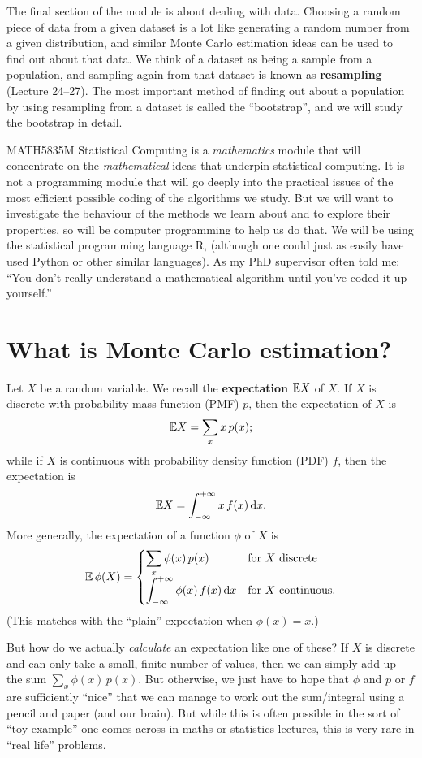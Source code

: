 \documentclass[
  letterpaper,
  DIV=11,
  numbers=noendperiod]{scrreprt}
\theoremstyle{plain}
\theoremstyle{definition}
\theoremstyle{definition}
\theoremstyle{remark}
\begin{document}
The final section of the module is about dealing with data. Choosing a
random piece of data from a given dataset is a lot like generating a
random number from a given distribution, and similar Monte Carlo
estimation ideas can be used to find out about that data. We think of a
dataset as being a sample from a population, and sampling again from
that dataset is known as \textbf{resampling} (Lecture 24--27). The most
important method of finding out about a population by using resampling
from a dataset is called the ``bootstrap'', and we will study the
bootstrap in detail.

MATH5835M Statistical Computing is a \emph{mathematics} module that will
concentrate on the \emph{mathematical} ideas that underpin statistical
computing. It is not a programming module that will go deeply into the
practical issues of the most efficient possible coding of the algorithms
we study. But we will want to investigate the behaviour of the methods
we learn about and to explore their properties, so will be computer
programming to help us do that. We will be using the statistical
programming language R, (although one could just as easily have used
Python or other similar languages). As my PhD supervisor often told me:
``You don't really understand a mathematical algorithm until you've
coded it up yourself.''

\section{What is Monte Carlo
estimation?}\label{what-is-monte-carlo-estimation}

Let \(X\) be a random variable. We recall the \textbf{expectation}
\(\mathbb{E} X\) of \(X\). If \(X\) is discrete with probability mass function
(PMF) \(p\), then the expectation of \(X\) is
\[ \mathbb{E} X = \sum_x x\,p(x) ;\] while if \(X\) is continuous with
probability density function (PDF) \(f\), then the expectation is
\[ \mathbb{E} X = \int_{-\infty}^{+\infty} x\,f(x)\,\mathrm{d}x . \] More
generally, the expectation of a function \(\phi\) of \(X\) is
\[ \operatorname{\mathbb{E}} \phi(X) = \begin{cases} {\displaystyle \sum_x \phi(x)\,p(x)} & \text{for $X$ discrete}\\ {\displaystyle \int_{-\infty}^{+\infty} \phi(x)\,f(x)\,\mathrm{d}x}  & \text{for $X$ continuous.} \end{cases}\]
(This matches with the ``plain'' expectation when \(\phi(x) = x\).)

But how do we actually \emph{calculate} an expectation like one of
these? If \(X\) is discrete and can only take a small, finite number of
values, then we can simply add up the sum \(\sum_x \phi(x)\,p(x)\). But
otherwise, we just have to hope that \(\phi\) and \(p\) or \(f\) are
sufficiently ``nice'' that we can manage to work out the sum/integral
using a pencil and paper (and our brain). But while this is often
possible in the sort of ``toy example'' one comes across in maths or
statistics lectures, this is very rare in ``real life'' problems.
\end{document}
